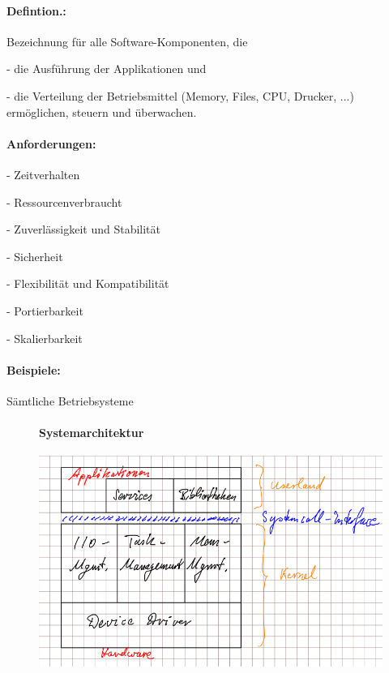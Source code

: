\documentclass[12pt,a4paper,oneside,ngerman]{article}
\begin{document}
\paragraph{Defintion.:}
Bezeichnung für alle Software-Komponenten, die
\begin{description}
	\item - die Ausführung der Applikationen und
	\item - die Verteilung der Betriebsmittel (Memory, Files, CPU, Drucker, ...) ermöglichen, steuern und überwachen.
\end{description}
\paragraph{Anforderungen:}
\begin{description}
	\item - Zeitverhalten
	\item - Ressourcenverbraucht
	\item - Zuverlässigkeit und Stabilität
	\item - Sicherheit
	\item - Flexibilität und Kompatibilität
	\item - Portierbarkeit
	\item - Skalierbarkeit
\end{description}
\paragraph{Beispiele:}
Sämtliche Betriebsysteme

\begin{figure}[H]
	\paragraph{Systemarchitektur}
	\centering
	\includegraphics[scale=0.5]{umlet/systemarchitektur.png}
\end{figure}
\end{document}
